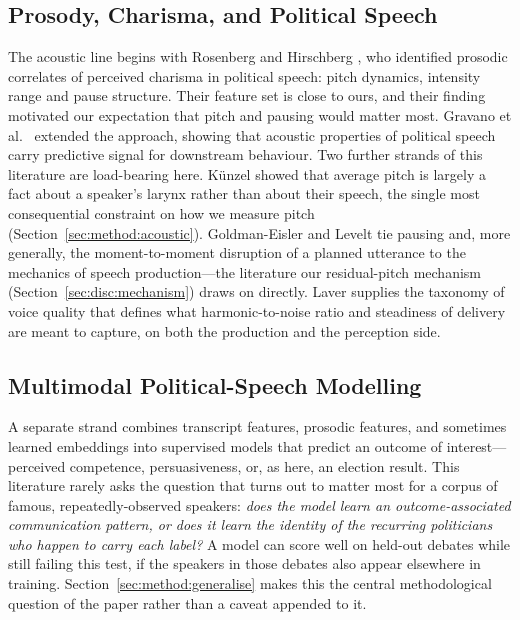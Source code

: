 \documentclass[journal]{IEEEtran}
\begin{document}
\subsection{Prosody, Charisma, and Political Speech}
\label{sec:related:prosody}

The acoustic line begins with Rosenberg and Hirschberg
\cite{rosenberg2009acoustic}, who identified prosodic correlates of perceived
charisma in political speech: pitch dynamics, intensity range and pause
structure. Their feature set is close to ours, and their finding motivated
our expectation that pitch and pausing would matter most. Gravano et al.\
\cite{hutto2018political} extended the approach, showing that acoustic
properties of political speech carry predictive signal for downstream
behaviour. Two further strands of this literature are load-bearing here.
K\"unzel \cite{kunzel1989speakers} showed that average pitch is largely a
fact about a speaker's larynx rather than about their speech, the single most
consequential constraint on how we measure pitch (Section~\ref{sec:method:acoustic}).
Goldman-Eisler \cite{goldman1968psycholinguistics} and Levelt
\cite{levelt1989speaking} tie pausing and, more generally, the moment-to-moment
disruption of a planned utterance to the mechanics of speech production---the
literature our residual-pitch mechanism (Section~\ref{sec:disc:mechanism})
draws on directly. Laver \cite{laver1980voice} supplies the taxonomy of voice
quality that defines what harmonic-to-noise ratio and steadiness of delivery
are meant to capture, on both the production and the perception side.

\subsection{Multimodal Political-Speech Modelling}
\label{sec:related:multimodal}

A separate strand combines transcript features, prosodic features, and
sometimes learned embeddings into supervised models that predict an outcome
of interest---perceived competence, persuasiveness, or, as here, an election
result. This literature rarely asks the question that turns out to matter
most for a corpus of famous, repeatedly-observed speakers: \emph{does the
model learn an outcome-associated communication pattern, or does it learn the
identity of the recurring politicians who happen to carry each label?} A
model can score well on held-out debates while still failing this test, if
the speakers in those debates also appear elsewhere in training.
Section~\ref{sec:method:generalise} makes this the central methodological
question of the paper rather than a caveat appended to it.
\end{document}
